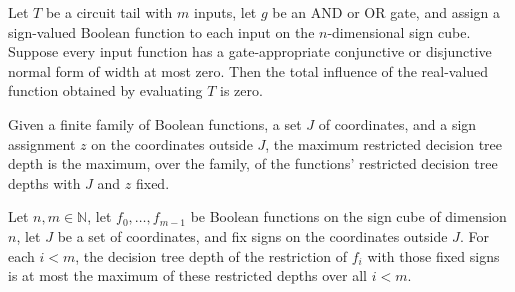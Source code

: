 \begin{theorem}
\label{FABL.CircuitTail.totalInfluence_evalFunction_eq_zero_of_width_zero}
\leanok
{}
Let $T$ be a circuit tail with $m$ inputs, let $g$ be an AND or OR gate, and assign a
sign-valued Boolean function to each input on the $n$-dimensional sign cube. Suppose
every input function has a gate-appropriate conjunctive or disjunctive normal form of
width at most zero. Then the total influence of the real-valued function obtained by
evaluating $T$ is zero.
\end{theorem}

\begin{definition}
\label{FABL.maxRestrictedDecisionTreeDepth}
\leanok
{}
Given a finite family of Boolean functions, a set $J$ of coordinates, and a sign
assignment $z$ on the coordinates outside $J$, the maximum restricted decision tree
depth is the maximum, over the family, of the functions’ restricted decision tree depths
with $J$ and $z$ fixed.
\end{definition}

\begin{theorem}
\label{FABL.restrictedDecisionTreeDepth_le_max}
\leanok
{}
Let $n,m\in\mathbb N$, let $f_0,\ldots,f_{m-1}$ be Boolean functions on the sign cube of
dimension $n$, let $J$ be a set of coordinates, and fix signs on the coordinates outside
$J$. For each $i<m$, the decision tree depth of the restriction of $f_i$ with those
fixed signs is at most the maximum of these restricted depths over all $i<m$.
\end{theorem}

